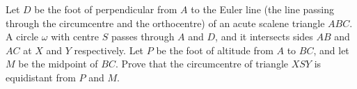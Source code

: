 Let 
$D$
 be the foot of perpendicular from 
$A$
 to the Euler line (the line passing through the circumcentre and the orthocentre) of an acute scalene triangle 
$ABC$. 
 A circle 
$\omega$
 with centre 
$S$
 passes through 
$A$
 and 
$D$, 
 and it intersects sides 
$AB$
 and 
$AC$
 at 
$X$
 and 
$Y$
 respectively. Let 
$P$
 be the foot of altitude from 
$A$
 to 
$BC$, 
 and let 
$M$
 be the midpoint of 
$BC$. 
 Prove that the circumcentre of triangle 
$XSY$
 is equidistant from 
$P$
 and 
$M$. 

